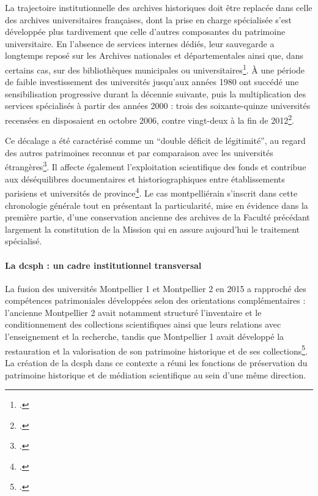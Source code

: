La trajectoire institutionnelle des archives historiques doit être replacée dans celle des archives universitaires françaises, dont la prise en charge spécialisée s'est développée plus tardivement que celle d'autres composantes du patrimoine universitaire. En l'absence de services internes dédiés, leur sauvegarde a longtemps reposé sur les Archives nationales et départementales ainsi que, dans certains cas, sur des bibliothèques municipales ou universitaires\footcite{MadayMechine2011}. À une période de faible investissement des universités jusqu'aux années 1980 ont succédé une sensibilisation progressive durant la décennie suivante, puis la multiplication des services spécialisés à partir des années 2000 : trois des soixante-quinze universités recensées en disposaient en octobre 2006, contre vingt-deux à la fin de 2012\footcite{Mercier2014}.

Ce décalage a été caractérisé comme un \enquote{double déficit de légitimité}, au regard des autres patrimoines reconnus et par comparaison avec les universités étrangères\footcite{Hottin2008}. Il affecte également l'exploitation scientifique des fonds et contribue aux déséquilibres documentaires et historiographiques entre établissements parisiens et universités de province\footcite{Dubois2022}. Le cas montpelliérain s'inscrit dans cette chronologie générale tout en présentant la particularité, mise en évidence dans la première partie, d'une conservation ancienne des archives de la Faculté précédant largement la constitution de la Mission qui en assure aujourd'hui le traitement spécialisé.

\paragraph{La \gls{dcsph} : un cadre institutionnel transversal}

La fusion des universités Montpellier 1 et Montpellier 2 en 2015 a rapproché des compétences patrimoniales développées selon des orientations complémentaires : l'ancienne Montpellier 2 avait notamment structuré l'inventaire et le conditionnement des collections scientifiques ainsi que leurs relations avec l'enseignement et la recherche, tandis que Montpellier 1 avait développé la restauration et la valorisation de son patrimoine historique et de ses collections\footcite{UMSchemaDirecteurPatrimoine2025}. La création de la \gls{dcsph} dans ce contexte a réuni les fonctions de préservation du patrimoine historique et de médiation scientifique au sein d'une même direction.

